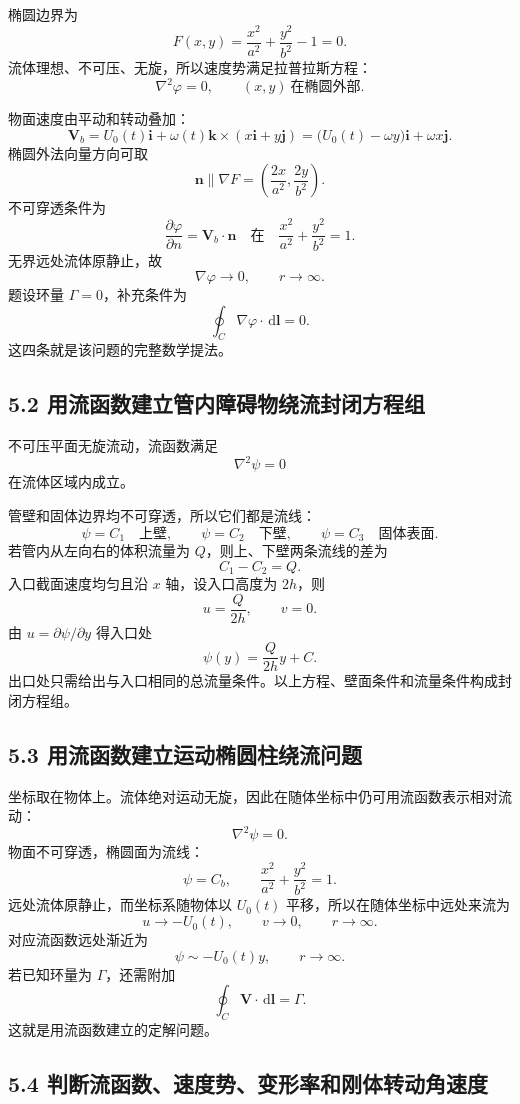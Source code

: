 \documentclass[UTF8,zihao=-4]{ctexart}
\newcommand{\dd}{\,\mathrm d}
\begin{document}
椭圆边界为
\[
F(x,y)=\frac{x^2}{a^2}+\frac{y^2}{b^2}-1=0 .
\]
流体理想、不可压、无旋，所以速度势满足拉普拉斯方程：
\[
\nabla^2\varphi=0,\qquad (x,y)\ \text{在椭圆外部}.
\]

物面速度由平动和转动叠加：
\[
\bm V_b=U_0(t)\bm i+\omega(t)\bm k\times (x\bm i+y\bm j)
=\bigl(U_0(t)-\omega y\bigr)\bm i+\omega x\bm j .
\]
椭圆外法向量方向可取
\[
\bm n \parallel \nabla F=\left(\frac{2x}{a^2},\frac{2y}{b^2}\right).
\]
不可穿透条件为
\[
\frac{\partial \varphi}{\partial n}=\bm V_b\cdot \bm n
\quad \text{在}\quad \frac{x^2}{a^2}+\frac{y^2}{b^2}=1.
\]
无界远处流体原静止，故
\[
\nabla\varphi\to 0,\qquad r\to\infty .
\]
题设环量 \(\Gamma=0\)，补充条件为
\[
\oint_C \nabla\varphi\cdot \dd\bm l=0 .
\]
这四条就是该问题的完整数学提法。

\subsection*{5.2 用流函数建立管内障碍物绕流封闭方程组}

不可压平面无旋流动，流函数满足
\[
\nabla^2\psi=0
\]
在流体区域内成立。

管壁和固体边界均不可穿透，所以它们都是流线：
\[
\psi=C_1\quad \text{上壁},\qquad
\psi=C_2\quad \text{下壁},\qquad
\psi=C_3\quad \text{固体表面}.
\]
若管内从左向右的体积流量为 \(Q\)，则上、下壁两条流线的差为
\[
C_1-C_2=Q .
\]
入口截面速度均匀且沿 \(x\) 轴，设入口高度为 \(2h\)，则
\[
u=\frac{Q}{2h},\qquad v=0 .
\]
由 \(u=\partial\psi/\partial y\) 得入口处
\[
\psi(y)=\frac{Q}{2h}y+C .
\]
出口处只需给出与入口相同的总流量条件。以上方程、壁面条件和流量条件构成封闭方程组。

\subsection*{5.3 用流函数建立运动椭圆柱绕流问题}

坐标取在物体上。流体绝对运动无旋，因此在随体坐标中仍可用流函数表示相对流动：
\[
\nabla^2\psi=0 .
\]
物面不可穿透，椭圆面为流线：
\[
\psi=C_b,\qquad \frac{x^2}{a^2}+\frac{y^2}{b^2}=1 .
\]
远处流体原静止，而坐标系随物体以 \(U_0(t)\) 平移，所以在随体坐标中远处来流为
\[
u\to -U_0(t),\qquad v\to 0,\qquad r\to\infty .
\]
对应流函数远处渐近为
\[
\psi\sim -U_0(t)y,\qquad r\to\infty .
\]
若已知环量为 \(\Gamma\)，还需附加
\[
\oint_C \bm V\cdot \dd\bm l=\Gamma .
\]
这就是用流函数建立的定解问题。

\subsection*{5.4 判断流函数、速度势、变形率和刚体转动角速度}
\end{document}
